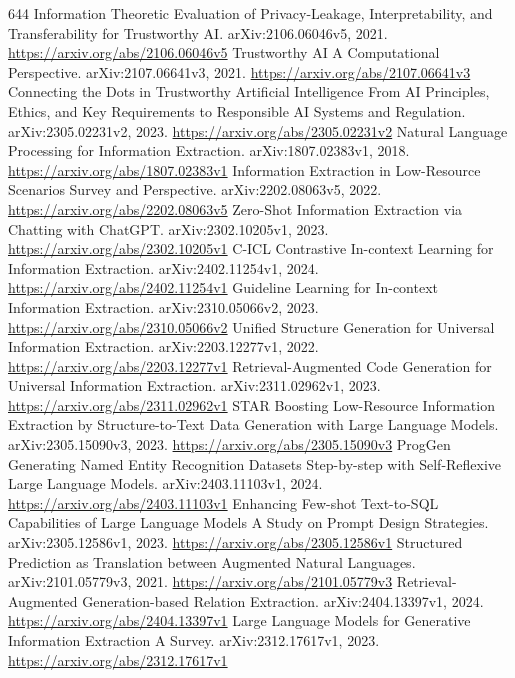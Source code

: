 \documentclass[11pt]{article}
\begin{document}
\begin{thebibliography}{644}
 Information Theoretic Evaluation of Privacy-Leakage, Interpretability, and Transferability for Trustworthy AI. arXiv:2106.06046v5, 2021. \url{https://arxiv.org/abs/2106.06046v5}
 Trustworthy AI A Computational Perspective. arXiv:2107.06641v3, 2021. \url{https://arxiv.org/abs/2107.06641v3}
 Connecting the Dots in Trustworthy Artificial Intelligence From AI Principles, Ethics, and Key Requirements to Responsible AI Systems and Regulation. arXiv:2305.02231v2, 2023. \url{https://arxiv.org/abs/2305.02231v2}
 Natural Language Processing for Information Extraction. arXiv:1807.02383v1, 2018. \url{https://arxiv.org/abs/1807.02383v1}
 Information Extraction in Low-Resource Scenarios Survey and Perspective. arXiv:2202.08063v5, 2022. \url{https://arxiv.org/abs/2202.08063v5}
 Zero-Shot Information Extraction via Chatting with ChatGPT. arXiv:2302.10205v1, 2023. \url{https://arxiv.org/abs/2302.10205v1}
 C-ICL Contrastive In-context Learning for Information Extraction. arXiv:2402.11254v1, 2024. \url{https://arxiv.org/abs/2402.11254v1}
 Guideline Learning for In-context Information Extraction. arXiv:2310.05066v2, 2023. \url{https://arxiv.org/abs/2310.05066v2}
 Unified Structure Generation for Universal Information Extraction. arXiv:2203.12277v1, 2022. \url{https://arxiv.org/abs/2203.12277v1}
 Retrieval-Augmented Code Generation for Universal Information Extraction. arXiv:2311.02962v1, 2023. \url{https://arxiv.org/abs/2311.02962v1}
 STAR Boosting Low-Resource Information Extraction by Structure-to-Text Data Generation with Large Language Models. arXiv:2305.15090v3, 2023. \url{https://arxiv.org/abs/2305.15090v3}
 ProgGen Generating Named Entity Recognition Datasets Step-by-step with Self-Reflexive Large Language Models. arXiv:2403.11103v1, 2024. \url{https://arxiv.org/abs/2403.11103v1}
 Enhancing Few-shot Text-to-SQL Capabilities of Large Language Models A Study on Prompt Design Strategies. arXiv:2305.12586v1, 2023. \url{https://arxiv.org/abs/2305.12586v1}
 Structured Prediction as Translation between Augmented Natural Languages. arXiv:2101.05779v3, 2021. \url{https://arxiv.org/abs/2101.05779v3}
 Retrieval-Augmented Generation-based Relation Extraction. arXiv:2404.13397v1, 2024. \url{https://arxiv.org/abs/2404.13397v1}
 Large Language Models for Generative Information Extraction A Survey. arXiv:2312.17617v1, 2023. \url{https://arxiv.org/abs/2312.17617v1}

\end{thebibliography}
\end{document}
